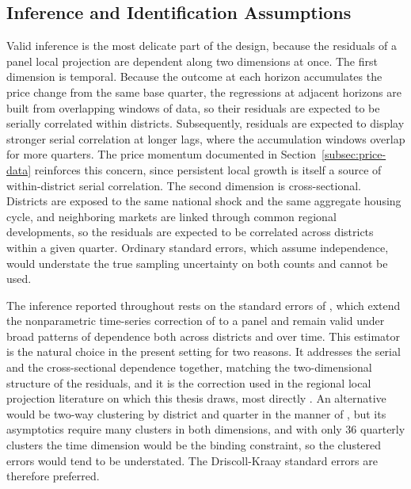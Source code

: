 \documentclass[a4paper,12pt, headsepline]{scrartcl}
\numberwithin{equation}{section}
\begin{document}
\subsection{Inference and Identification Assumptions}\label{subsec:inference}
Valid inference is the most delicate part of the design, because the residuals of a panel local projection are dependent along two dimensions at once. The first dimension is temporal. Because the outcome at each horizon accumulates the price change from the same base quarter, the regressions at adjacent horizons are built from overlapping windows of data, so their residuals are expected to be serially correlated within districts. Subsequently, residuals are expected to display stronger serial correlation at longer lags, where the accumulation windows overlap for more quarters. The price momentum documented in Section~\ref{subsec:price-data} reinforces this concern, since persistent local growth is itself a source of within-district serial correlation. The second dimension is cross-sectional. Districts are exposed to the same national shock and the same aggregate housing cycle, and neighboring markets are linked through common regional developments, so the residuals are expected to be correlated across districts within a given quarter. Ordinary standard errors, which assume independence, would understate the true sampling uncertainty on both counts and cannot be used.

The inference reported throughout rests on the standard errors of \citet{driscoll1998}, which extend the nonparametric time-series correction of \citet{neweywest1987} to a panel and remain valid under broad patterns of dependence both across districts and over time. This estimator is the natural choice in the present setting for two reasons. It addresses the serial and the cross-sectional dependence together, matching the two-dimensional structure of the residuals, and it is the correction used in the regional local projection literature on which this thesis draws, most directly \citet{aastveit2022}. An alternative would be two-way clustering by district and quarter in the manner of \citet{cameron2011}, but its asymptotics require many clusters in both dimensions, and with only 36 quarterly clusters the time dimension would be the binding constraint, so the clustered errors would tend to be understated. The Driscoll-Kraay standard errors are therefore preferred.
\end{document}
